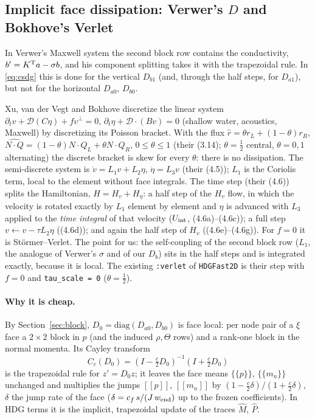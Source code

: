 \documentclass[11pt,a4paper]{article}
\newcommand{\avg}[1]{\{\!\{#1\}\!\}}
\newcommand{\jump}[1]{[\![#1]\!]}
\newcommand{\code}[1]{\texttt{#1}}
\begin{document}
\subsection{Implicit face dissipation: Verwer's $D$ and Bokhove's Verlet}\label{sec:implicitD}
In Verwer's Maxwell system the second block row contains the conductivity, $b'=K^{\rm T}a-\sigma b$, and his component
splitting takes it with the trapezoidal rule. In \eqref{eq:csdg} this is done for the vertical $D_{b1}$ (and, through
the half steps, for $D_{a1}$), but not for the horizontal $D_{a0}$, $D_{b0}$.

Xu, van der Vegt and Bokhove \cite{xvb} discretize the linear system $\partial_tv+\mathcal D(C\eta)+fv^\perp=0$,
$\partial_t\eta+\mathcal D\cdot(Bv)=0$ (shallow water, acoustics, Maxwell) by discretizing its Poisson bracket. With the
flux $\hat r=\theta r_L+(1-\theta)r_R$, $\widehat{N\cdot Q}=(1-\theta)N\cdot Q_L+\theta N\cdot Q_R$, $0\le\theta\le1$ (their (3.14); $\theta=\tfrac12$
central, $\theta=0,1$ alternating) the discrete bracket is skew for every $\theta$: there is no dissipation. The semi-discrete
system is $\dot v=L_1v+L_2\eta$, $\dot\eta=L_3v$ (their (4.5)); $L_1$ is the Coriolis term, local to the element without face
integrals. The time step (their (4.6)) splits the Hamiltonian, $H=H_v+H_\eta$: a half step of the $H_v$ flow, in which the
velocity is rotated exactly by $L_1$ element by element and $\eta$ is advanced with $L_3$ applied to the \emph{time integral}
of that velocity ($U_{\rm int}$, (4.6a)--(4.6c)); a full step $v\leftarrow v-\tau L_2\eta$ ((4.6d)); and again the half step of $H_v$
((4.6e)--(4.6g)). For $f=0$ it is Störmer--Verlet. The point for us: the self-coupling of the second block row ($L_1$, the
analogue of Verwer's $\sigma$ and of our $D_b$) sits in the half steps and is integrated exactly, because it is local. The
existing \code{:verlet} of \code{HDGFast2D} is their step with $f=0$ and \code{tau\_scale = 0} ($\theta=\tfrac12$).

\paragraph{Why it is cheap.} By Section~\ref{sec:block}, $D_0=\mathrm{diag}(D_{a0},D_{b0})$ is face local: per node pair of a $\xi$
face a $2\times2$ block in $p$ (and the induced $\rho,\Theta$ rows) and a rank-one block in the normal momenta. Its
Cayley transform
\[
C_c(D_0)=(I-\tfrac c2D_0)^{-1}(I+\tfrac c2D_0)
\]
is the trapezoidal rule for $z'=D_0z$; it leaves the face means $\avg p$, $\avg{m_n}$ unchanged and multiplies the jumps
$\jump p$, $\jump{m_n}$ by $(1-\tfrac c2\delta)/(1+\tfrac c2\delta)$, $\delta$ the jump rate of the face ($\delta=c_f\,s/(J\,w_{\rm end})$ up to the
frozen coefficients). In HDG terms it is the implicit, trapezoidal update of the traces $\hat M$, $\hat P$.
\end{document}
